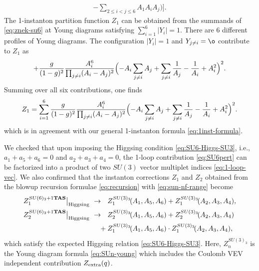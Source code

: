 \documentclass[letterpaper, 11pt]{article}
\begin{document}
{\begin{align}
    - \sum_{2\leq i<j \leq 6} A_1 A_i  A_j %
    \Bigr)
    \Biggr].
\end{align}
The 1-instanton partition function $Z_1$ can be obtained from the summands of \eqref{eq:znek-su6} at Young diagrams satisfying $\sum_{i=1}^6 |Y_i|=1$. There are 6 different profiles of Young diagrams. The configuration $|Y_i| = 1$ and %
$Y_{j\neq i} = \o$ contribute to $Z_{1}$ as
\begin{align}
  + \frac{g}{(1-g)^2} \frac{A_i^6}{\prod_{j \neq i} (A_i - A_j)^2} 
  \Bigl(-A_i \sum_{j\neq i} A_j +  \sum_{j\neq i}\frac{1}{A_j}  - \frac{1}{A_i} + A_i^2
 \Bigr)^2. 
\end{align}
Summing over all six contributions, one finds
\begin{align}
  Z_1 = \sum_{i=1}^6 \frac{g}{(1-g)^2} \frac{A_i^6}{\prod_{j \neq i} (A_i - A_j)^2} 
  \Bigl(-A_i \sum_{j\neq i} A_j +  \sum_{j\neq i}\frac{1}{A_j}  - \frac{1}{A_i} + A_i^2
 \Bigr)^2. 
\end{align}
which is in agreement with our general 1-instanton formula \eqref{eq:1inst-formula}.

We checked that upon imposing the Higgsing condition \eqref{eq:SU6-Higgs-SU3}, i.e., $a_1 + a_5 + a_6 = 0$ and $a_2 + a_3 + a_4 = 0$, the 1-loop contribution \eqref{eq:SU6pert} can be factorized into a product of two $SU(3)$ vector multiplet indices \eqref{eq:1-loop-vec}. We also confirmed that the instanton corrections $Z_1$ and $Z_2$ obtained from the blowup recursion formulae \eqref{eq:recursion} with \eqref{eq:sun-nf-range} become
\begin{align}
  \begin{split}
  Z_1^{SU(6)_{3}+1{\bf TAS}}\big|_{\rm Higgsing}~&\rightarrow ~~ Z_1^{SU(3)_{3}}
  \!(A_1, A_5,A_6)+Z_1^{SU(3)_{3}}\!(A_2, A_3,A_4),\\
  Z_2^{SU(6)_{3}+1{\bf TAS}}\big|_{\rm Higgsing}~&\rightarrow ~~ Z_2^{SU(3)_{3}}\!(A_1, A_5,A_6)+Z_2^{SU(3)_{3}}\!(A_2, A_3,A_4) \\
  &\quad+ Z_1^{SU(3)_{3}}\!(A_1, A_5,A_6)\cdot Z_1^{SU(3)_{3}}\!(A_2, A_3,A_4),
  \end{split}
\end{align}
which satisfy the expected Higgsing relation \eqref{eq:SU6-Higgs-SU3}. Here, $Z_n^{SU(3)_3}$ is the Young
diagram formula \eqref{eq:SUn-young} which includes the Coulomb VEV independent contribution $Z_{\rm extra}(q)$.



}
\end{document}
